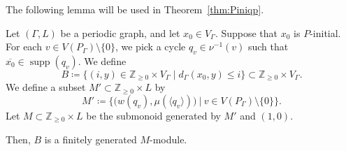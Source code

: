 \documentclass[ALCO,published]{cedram}
\theoremstyle{remark}
\begin{document}
The following lemma will be used in Theorem~\ref{thm:Piniqp}. 
\begin{lem}\label{lem:fg}
Let $(\Gamma, L)$ be a periodic graph, and let $x_0 \in V_{\Gamma}$. Suppose that $x_0$ is $P$-initial. 
For each $v \in V(P_{\Gamma}) \setminus \{ 0 \}$, we pick a cycle $q_v \in \nu^{-1}(v)$ such that 
$\overline{x_0} \in \operatorname{supp}(q_v)$. 
We define
\[
B \coloneqq  \{ (i, y) \in \mathbb{Z}_{\ge 0} \times V_{\Gamma} \mid d_{\Gamma}(x_0, y) \le i \} \subset \mathbb{Z}_{\ge 0} \times V_{\Gamma}. 
\]
We define a subset $M' \subset \mathbb{Z}_{\ge 0} \times L$ by 
\[
M' \coloneqq  \bigl\{ \bigl( w(q_v), \mu(\langle q_v \rangle) \bigr) \ \big | \ v \in V(P_{\Gamma}) \setminus \{ 0 \} \bigr \}. 
\]
Let $M \subset \mathbb{Z}_{\ge 0} \times L$ be the submonoid generated by $M'$ and $(1,0)$. 

Then, $B$ is a finitely generated $M$-module. 
\end{lem}
\end{document}
